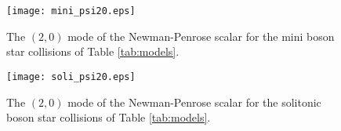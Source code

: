 \documentclass[11pt]{report}  %
\begin{document}
%
%
\begin{figure}
    \centering
    \texttt{[image: mini\_psi20.eps]}
    \caption{The $(2,0)$ mode of the Newman-Penrose scalar
    for the mini boson star collisions of Table \ref{tab:models}.
    }
    \label{fig:mini_psi20}
\end{figure}
%
%
\begin{figure}
    \centering
    \texttt{[image: soli\_psi20.eps]}
    \caption{The $(2,0)$ mode of the Newman-Penrose scalar
    for the solitonic boson star collisions of Table \ref{tab:models}.
    }
    \label{fig:soli_psi20}
\end{figure}
%

\end{document}
